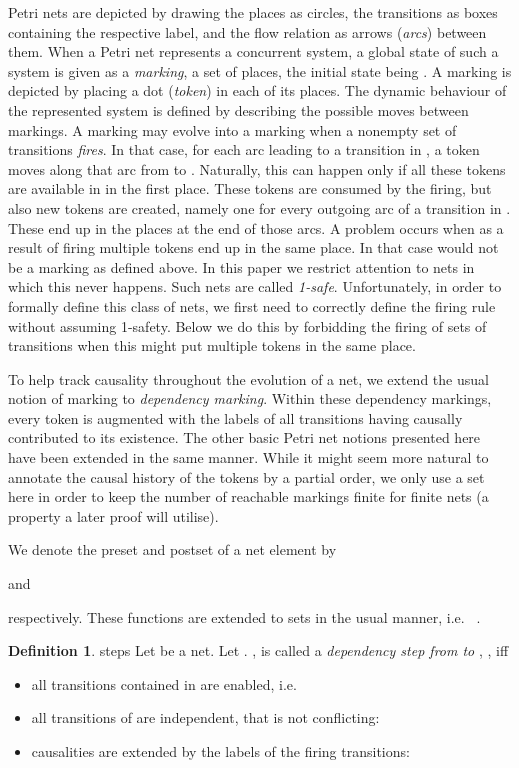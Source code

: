 \documentclass[submission,copyright,creativecommons]{eptcs}
\theoremstyle{definition}
\newtheorem{definition}{Definition}
\def\defitem#1{\emph{#1}}
\def\ie{i.e.\ }
\begin{document}
\noindent
Petri nets are depicted by drawing the places as circles, the
transitions as boxes containing the respective label, and the flow
relation as arrows (\defitem{arcs}) between them.
When a Petri net represents a concurrent system, a global state of such a system is
given as a \defitem{marking}, a set of places, the initial state being
.  A marking is depicted by placing a dot (\defitem{token}) in
each of its places.  The dynamic behaviour of the represented system
is defined by describing the possible moves between markings. A
marking  may evolve into a marking  when a nonempty set of transitions
 \defitem{fires}. In that case, for each arc  leading
to a transition  in , a token moves along that arc from  to
.  Naturally, this can happen only if all these tokens are
available in  in the first place. These tokens are consumed by the
firing, but also new tokens are created, namely one for every outgoing
arc of a transition in . These end up in the places at the end of
those arcs.  A problem occurs when as a result of firing  multiple
tokens end up in the same place. In that case  would not be
a marking as defined above. In this paper we restrict
attention to nets in which this never happens. Such nets are called
\defitem{1-safe}.  Unfortunately, in order to formally define this
class of nets, we first need to correctly define the firing rule
without assuming 1-safety. Below we do this by forbidding the firing
of sets of transitions when this might put multiple tokens in the same
place.

To help track causality throughout the evolution of a net, we extend the usual
notion of marking to \defitem{dependency marking}. Within these dependency
markings, every token is augmented with the labels of all transitions having
causally contributed to its existence.
The other basic Petri net notions
presented here have been extended in the same manner.
While it might seem more natural
to annotate the causal history of the tokens by a partial order, we only
use a set here in order to keep the number of reachable markings finite
for finite nets (a property a later proof will utilise).

We denote the preset and postset of a net element  by

and

respectively.
These functions are extended to sets in the usual manner, \ie
.

\begin{definition}{steps}{
  Let  be a net.
  Let .
  }
  , is called a \defitem{dependency step from  to },
  , iff
  \begin{itemize}
    \item all transitions contained in  are enabled, i.e.
      
    \item all transitions of  are independent, that is not conflicting:
      
    \item causalities are extended by the labels of the firing transitions:
      
  \end{itemize}
\end{definition}
\end{document}
